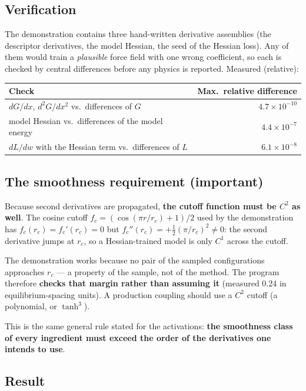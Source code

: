 \documentclass[10pt,a4paper]{article}
\begin{document}
\subsection{Verification}

The demonstration contains three hand-written derivative assemblies
(the descriptor derivatives, the model Hessian, the seed of the
Hessian loss). Any of them would train a \emph{plausible} force field
with one wrong coefficient, so each is checked by central differences
before any physics is reported. Measured (relative):

\begin{center}
\begin{tabular}{@{}lr@{}}
\toprule
Check & Max.\ relative difference \\
\midrule
$dG/dx$, $d^2G/dx^2$ vs.\ differences of $G$ & $4.7\times10^{-10}$ \\
model Hessian vs.\ differences of the model energy & $4.4\times10^{-7}$ \\
$dL/dw$ with the Hessian term vs.\ differences of $L$ & $6.1\times10^{-8}$ \\
\bottomrule
\end{tabular}
\end{center}

\subsection{The smoothness requirement (important)}

Because second derivatives are propagated, \textbf{the cutoff
function must be $C^2$ as well}. The cosine cutoff
$f_c=(\cos(\pi r/r_c)+1)/2$ used by the demonstration has
$f_c(r_c)=f_c'(r_c)=0$ but
$f_c''(r_c)=+\tfrac12(\pi/r_c)^2\neq0$: the second derivative jumps
at $r_c$, so a Hessian-trained model is only $C^1$ across the
cutoff.

The demonstration works because no pair of the sampled
configurations approaches $r_c$ --- a property of the sample, not of
the method. The program therefore \textbf{checks that margin rather
than assuming it} (measured 0.24 in equilibrium-spacing units). A
production coupling should use a $C^2$ cutoff (a polynomial, or
$\tanh^3$).

This is the same general rule stated for the activations: \textbf{the
smoothness class of every ingredient must exceed the order of the
derivatives one intends to use}.

\subsection{Result}
\end{document}
